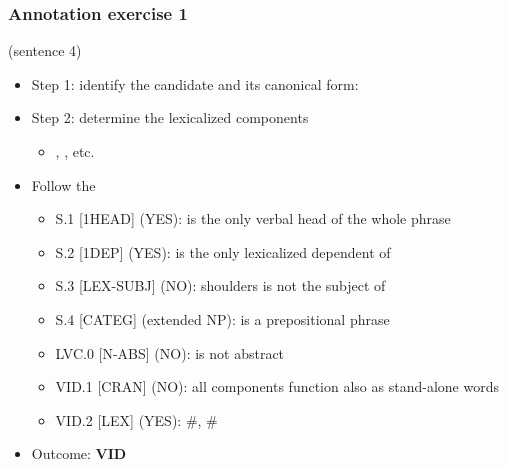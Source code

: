 \documentclass[xcolor=dvipsnames]{beamer}
\begin{document}
\begin{frame} 
\frametitle{Annotation exercise 1 \href{https://mwe.phil.hhu.de/}{\beamergotobutton{[FLAT]}}\href{http://parsemefr.lif.univ-mrs.fr/parseme-st-guidelines/1.3}{\beamergotobutton{[guidelines]}}}


 (sentence 4)

\begin{scriptsize}
\begin{block}{}
\begin{itemize}
\item Step 1: identify the candidate and its canonical form: 
\item Step 2: determine the lexicalized components
   \begin{itemize}
   \item {}, , etc.
   \end{itemize}
\item Follow the \href{http://parsemefr.lif.univ-mrs.fr/parseme-st-guidelines/1.3/?page=040\_Annotation\_process\_-\_decision\_tree}{}
   \begin{itemize}
   \item S.1 [1HEAD] (YES):  is the only verbal head of the whole phrase
   \item S.2 [1DEP] (YES):  is the only lexicalized dependent of 
   \item S.3 [LEX-SUBJ] (NO):  shoulders is not the subject of 
   \item S.4 [CATEG] (extended NP):  is a prepositional phrase
   \item LVC.0 [N-ABS] (NO):  is not abstract
   \item VID.1 [CRAN] (NO): all components function also as stand-alone words
   \item VID.2 [LEX] (YES): \#, \#
   \end{itemize}
\item Outcome: \textbf{VID}
\end{itemize}
\end{block}

\end{scriptsize}

\end{frame}
\end{document}
